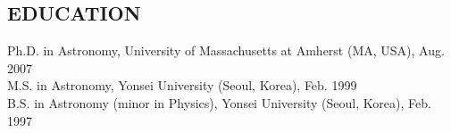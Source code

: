 \documentclass[margin,centered]{res}
\begin{document}
\begin{resume}
\section{EDUCATION} 
Ph.D. in Astronomy, University of Massachusetts at Amherst (MA, USA), Aug. 2007 \\
M.S. in Astronomy, Yonsei University (Seoul, Korea), Feb. 1999 \\
B.S. in Astronomy (minor in Physics), Yonsei University (Seoul, Korea), Feb. 1997 \\
 

\end{resume}
\end{document}
